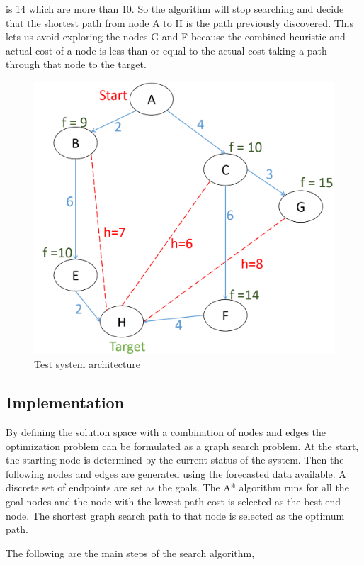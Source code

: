 is 14 which are more than 10. So the algorithm will stop searching and decide that the shortest path from node A to H is the path previously discovered. This lets us avoid exploring the nodes G and F because the combined heuristic and actual cost of a node is less than or equal to the actual cost taking a path through that node to the target.

\begin{figure}[!ht]
\centering
\includegraphics[width=\linewidth]{figs/A_STAR_PIC.png}
\caption{Test system architecture}
\label{fig:A_STAR_PIC}
\end{figure}

\subsection{Implementation}
By defining the solution space with a combination of nodes and edges the optimization problem can be formulated as a graph search problem. At the start, the starting node is determined by the current status of the system. Then the following nodes and edges are generated using the forecasted data available. A discrete set of endpoints are set as the goals. The A*  algorithm runs for all the goal nodes and the node with the lowest path cost is selected as the best end node. The shortest graph search path to that node is selected as the optimum path.

The following are the main steps of the search algorithm,


